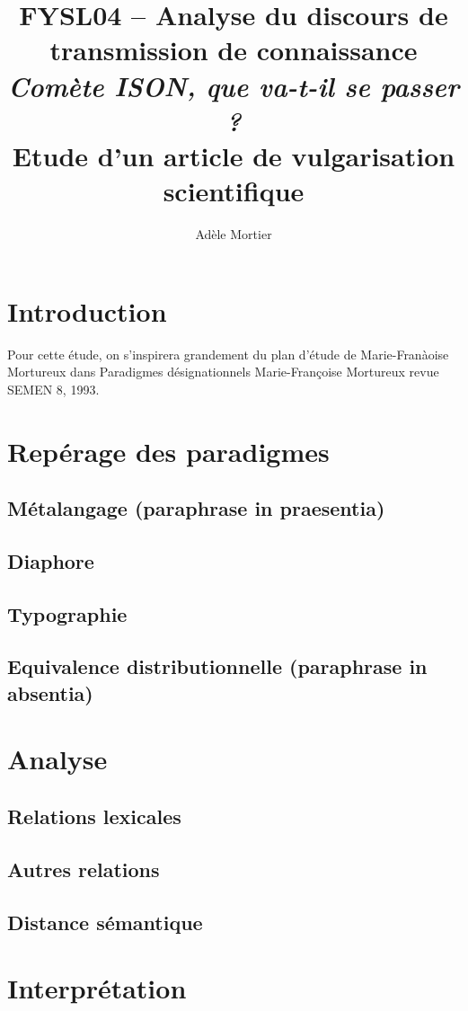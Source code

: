 \documentclass[a4paper,10pt]{article}
\title{FYSL04 -- Analyse du discours de transmission de connaissance\\
	\textit{Comète ISON, que va-t-il se passer ?}\\ \vspace{0.3cm}
	\small Etude d'un article de vulgarisation scientifique}
\author{Adèle Mortier}
\begin{document}
\maketitle
\nocite{*}

\section{Introduction}

Pour cette étude, on s'inspirera grandement du plan d'étude de Marie-Franàoise Mortureux dans Paradigmes désignationnels
Marie-Françoise Mortureux revue SEMEN 8, 1993.


\section{Repérage des paradigmes}
	\subsection{Métalangage (paraphrase in praesentia)}
	\subsection{Diaphore}
	\subsection{Typographie}
	\subsection{Equivalence distributionnelle (paraphrase in absentia)}


\section{Analyse}
	\subsection{Relations lexicales}
	\subsection{Autres relations}
	\subsection{Distance sémantique}

\section{Interprétation}
\end{document}
